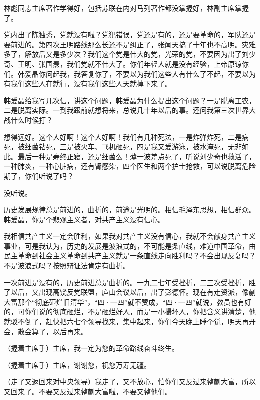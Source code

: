 林彪同志主席著作学得好，包括苏联在内对马列著作都没掌握好，林副主席掌握了。

党内出了陈独秀，党就没有啦？党犯错误，党还是有的，还是要革命的，军队还是要前进的。第四次王明路线那么长还不是纠正了，张闻天搞了十年也不高明。灾难多了，解放后又是多少次？我们这个党是伟大的党，光荣的党，不要因为出了刘少奇、王明、张国焘，我们党就不伟大了。你们年轻人就是没有经验，上帝原谅你们。韩爱晶你问起我，我答复你了，不要以为我们这些人有什么了不起，不要以为有我们这些人在就行，没有我们这些人天就掉下来了。

韩爱晶给我写几次信，讲这个问题，韩爱晶为什么提出这个问题？一是脱离工农，二是脱离实际。一到我跟前就想将来，总说几十年以后的事。还问我第三次世界大战什么时候打？

想得远好。这个人好啊！这个人好啊！我们有几种死法，一是炸弹炸死，二是病死，被细菌钻死，三是被火车、飞机砸死，四是我又爱游泳，被水淹死，无非如此。最后一种是寿终正寝，还是细菌么！薄一波差点死了，听说刘少奇也救活了，一种肺炎，一种心脏病，还有肾感染，四个医生和两个护士抢救，可以说脱离危险期了，你们听说了吗？

没听说。

历史发展规律总是前进的，曲折的，前途是光明的。相信毛泽东思想，相信群众。韩爱晶，你是个悲观主义者，对共产主义没有信心。

我相信共产主义一定会胜利，如果我对共产主义没有信心，我就不会献身共产主义事业，可是我认为，历史的发展是波浪式的，不可能是条直线，难道中国革命，由民主革命到社会主义革命到共产主义就是一条直线走向胜利吗？不会出现反复吗？不是波浪式吗？按照辩证法肯定有曲折。

一次前进是没有的，历史前进总是曲折的。一九二七年受挫折，二三次受挫折，胜了以后，又出现高饶反党联盟，庐山会议以后，出了彭德怀。现在有走资派，像蒯大富那个“彻底砸烂旧清华”，“四·一四”就不赞成，“四·一四”就说，教员也有好的，可你们说的彻底砸烂，不是砸烂好人，而是一小撮坏人，你把含义讲清楚，他就驳不倒了，赶快把六七个领导找来，集中起来，你们今天晚上睡个觉，明天再开会，散会算了，以后再来。

（握着主席手）主席，我一定为您的革命路线奋斗终生。

（握着主席手）主席，谢谢您，祝您万寿无疆。

（走了又返回来对中央领导）我走了，又不放心，怕你们又反过来整蒯大富，所以又回来了。不要又反过来整蒯大富啦，不要又整他们。


